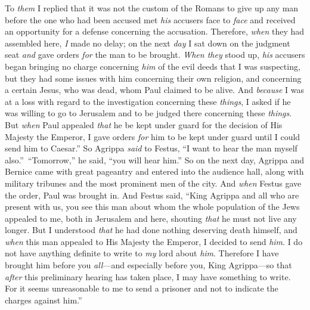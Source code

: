 \begin{biblechapter}
\verse To \textit{them} I replied that it was not the custom of the Romans to give up any man before the one who had been accused met \textit{his} accusers face to \textit{face} and received an opportunity for a defense concerning the accusation.
\verse Therefore, \textit{when} they had assembled here, \textit{I} made no delay; on the next \textit{day} I sat down on the judgment seat \textit{and} gave orders \textit{for} the man to be brought.
\verse \textit{When they} stood up, \textit{his} accusers began bringing no charge concerning \textit{him} of the evil deeds that I was suspecting,
\verse but they had some issues with him concerning their own religion, and concerning a certain Jesus, who was dead, whom Paul claimed to be alive.
\verse And \textit{because} I was at a loss with regard to the investigation concerning these \textit{things}, I asked if he was willing to go to Jerusalem and to be judged there concerning these \textit{things}.
\verse But \textit{when} Paul appealed \textit{that} he be kept under guard for the decision of His Majesty the Emperor, I gave orders \textit{for} him to be kept under guard until I could send him to Caesar.”
\verse So Agrippa \textit{said} to Festus, “I want to hear the man myself also.” “Tomorrow,” he said, “you will hear him.”
\verse So on the next day, Agrippa and Bernice came with great pageantry and entered into the audience hall, along with military tribunes and the most prominent men of the city. And \textit{when} Festus gave the order, Paul was brought in.
\verse And Festus said, “King Agrippa and all who are present with us, you see this man about whom the whole population of the Jews appealed to me, both in Jerusalem and here, shouting \textit{that} he must not live any longer.
\verse But I understood \textit{that} he had done nothing deserving death himself, and \textit{when} this man appealed to His Majesty the Emperor, I decided to send \textit{him}.
\verse I do not have anything definite to write to \textit{my} lord about \textit{him}. Therefore I have brought him before you \textit{all}—and especially before you, King Agrippa—so that \textit{after} this preliminary hearing has taken place, I may have something to write.
\verse For it seems unreasonable to me to send a prisoner and not to indicate the charges against him.”
\end{biblechapter}

